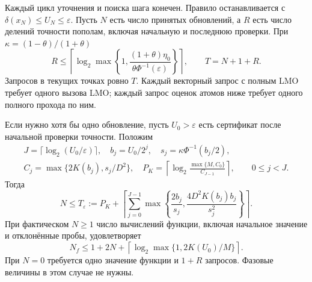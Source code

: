 \begin{theorem}\label{nloracle:main}
Каждый цикл уточнения и поиска шага конечен. Правило останавливается
с $\delta(x_N)\le U_N\le\varepsilon$.
Пусть $N$ есть число принятых обновлений, а $R$ есть число делений
точности пополам, включая начальную и последнюю проверки.
При $\kappa=(1-\theta)/(1+\theta)$
\begin{equation}\label{nloracle:refinement}
 R\le\left\lceil\log_2\max\left\{1,
 \frac{(1+\theta)\eta_0}{\theta\Phi^{-1}(\varepsilon)}\right\}\right\rceil,
 \qquad T=N+1+R.
\end{equation}
Запросов в текущих точках ровно $T$.
Каждый векторный запрос с полным LMO требует одного вызова LMO;
каждый запрос оценок атомов ниже требует одного полного прохода по ним.

Если нужно хотя бы одно обновление, пусть $U_0>\varepsilon$ есть
сертификат после начальной проверки точности. Положим
\[
 \begin{gathered}
 J=\lceil\log_2(U_0/\varepsilon)\rceil,\quad b_j=U_0/2^j,\quad
 s_j=\kappa\Phi^{-1}(b_j/2),\\
 C_j=\max\{2K(b_j),s_j/D^2\},\quad
 P_K=\left\lceil\log_2\frac{\max\{M,C_0\}}{C_{J-1}}\right\rceil,
 \qquad 0\le j<J.
 \end{gathered}
\]
Тогда
\begin{equation}\label{nloracle:work}
 N\le T_\varepsilon:=P_K+
 \left\lceil\sum_{j=0}^{J-1}
 \max\left\{\frac{2b_j}{s_j},\frac{4D^2K(b_j)b_j}{s_j^2}\right\}\right\rceil.
\end{equation}
При фактическом $N\ge1$ число вычислений функции, включая
начальное значение и отклонённые пробы, удовлетворяет
\begin{equation}\label{nloracle:functions}
 N_f\le1+2N+
 \left\lceil\log_2\max\{1,2K(U_0)/M\}\right\rceil.
\end{equation}
При $N=0$ требуется одно значение функции и $1+R$ запросов.
Фазовые величины в этом случае не нужны.
\end{theorem}


